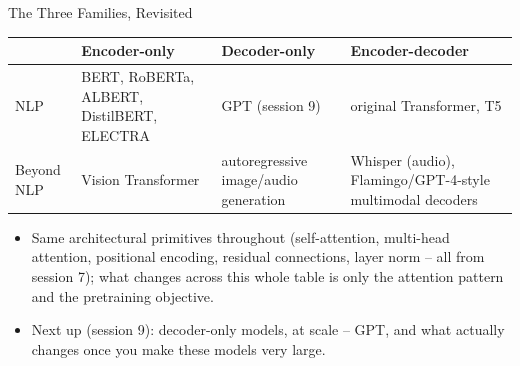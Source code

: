\begin{vbframe}{The Three Families, Revisited}

\begin{center}
\footnotesize
\begin{tabular}{@{}p{1.6cm}p{2.6cm}p{2.6cm}p{3.3cm}@{}}
\toprule
 & \textbf{Encoder-only} & \textbf{Decoder-only} & \textbf{Encoder-decoder} \\
\midrule
NLP & BERT, RoBERTa, ALBERT, DistilBERT, ELECTRA & GPT (session 9) & original Transformer, T5 \\[4pt]
Beyond NLP & Vision Transformer & autoregressive image/audio generation & Whisper (audio), Flamingo/GPT-4-style multimodal decoders \\
\bottomrule
\end{tabular}
\end{center}

\begin{itemize}
	\item Same architectural primitives throughout (self-attention, multi-head attention, positional encoding, residual connections, layer norm -- all from session 7); what changes across this whole table is only the attention pattern and the pretraining objective.
	\item Next up (session 9): decoder-only models, at scale -- GPT, and what actually changes once you make these models very large.
\end{itemize}

\end{vbframe}

